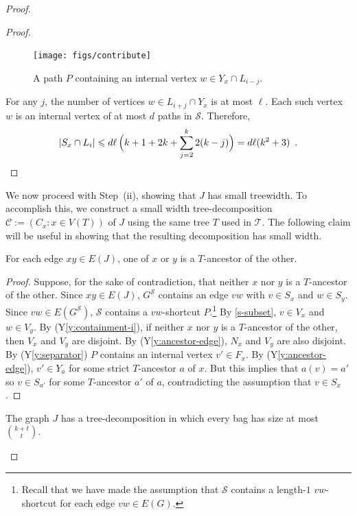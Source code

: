 \documentclass{patmorin}
\newcommand{\yref}[1]{(Y\ref{y:#1})}
\renewcommand{\SS}{\mathcal{S}}
\renewcommand{\le}{\leqslant}
\begin{document}
\begin{proof}
\begin{proof}
  \begin{figure}[htbp]
    \begin{center}
      \texttt{[image: figs/contribute]}
    \end{center}
    \caption{A path $P$ containing an internal vertex $w\in Y_x\cap L_{i-j}$.}
    \label{contribute}
  \end{figure}


  For any $j$, the number of vertices $w\in L_{i+j}\cap Y_x$ is at most $\ell$. Each such vertex $w$ is an internal vertex of at most $d$ paths in $\SS$. Therefore,
  \[  |S_x\cap L_i|\le d\ell  \, \Big(k+1 + 2k + \sum_{j=2}^k 2(k-j)\Big) %
      = d\ell(k^2 +3) \enspace . \qedhere
  \]
\end{proof}

We now proceed with Step~(ii), showing that $J$ has small treewidth. To accomplish this, we construct a small width tree-decomposition $\mathcal{C}:=(C_x:x\in V(T))$ of $J$ using the same tree $T$ used in $\mathcal{T}$.  The following claim will be useful in showing that the resulting decomposition has small width.

\begin{clm}\label{i-ancestor}
  For each edge $xy\in E(J)$, one of $x$ or $y$ is a $T$-ancestor of the other.
\end{clm}

\begin{proof}
  Suppose, for the sake of contradiction, that neither $x$ nor $y$ is a $T$-ancestor of the other.  Since $xy\in E(J)$, $G^\SS$ contains an edge $vw$ with $v\in S_x$ and $w\in S_y$.  Since $vw\in E(G^{\SS})$,  $\SS$ contains a $vw$-shortcut $P$.\footnote{Recall that we have made the assumption that $\SS$ contains a length-$1$ $vw$-shortcut for each edge $vw\in E(G)$.}  By \cref{s-subset}, $v\in V_x$ and $w\in V_y$.  By \yref{containment-i}, if neither $x$ nor $y$ is a $T$-ancestor of the other, then $V_x$ and $V_y$ are disjoint.  By \yref{ancestor-edge}, $N_x$ and $V_y$ are also disjoint.  By \yref{separator} $P$ contains an internal vertex $v'\in F_x$.  By \yref{ancestor-edge}, $v'\in Y_a$ for some strict $T$-ancestor $a$ of $x$.  But this implies that $a(v)=a'$ so $v\in S_{a'}$ for some $T$-ancestor $a'$ of $a$, contradicting the assumption that $v\in S_x$.
\end{proof}

\begin{clm}
\label{general-bag-size}
The graph $J$ has a tree-decomposition in which every bag has size at most $\binom{k+t}{t}$.
\end{clm}


\end{proof}
\end{document}
